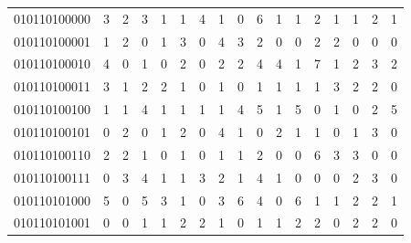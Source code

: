 \documentclass[10pt,a4paper]{article}
\begin{document}
\begin{longtable}{ |c|c|c|c|c|c|c|c|c|c|c|c|c|c|c|c|c| }
    010110100000              & 3                            & 2                                & 3                            & 1                              & 1   & 4   & 1   & 0   & 6   & 1   & 1   & 2   & 1   & 1   & 2   & 1   \\
    010110100001              & 1                            & 2                                & 0                            & 1                              & 3   & 0   & 4   & 3   & 2   & 0   & 0   & 2   & 2   & 0   & 0   & 0   \\
    010110100010              & 4                            & 0                                & 1                            & 0                              & 2   & 0   & 2   & 2   & 4   & 4   & 1   & 7   & 1   & 2   & 3   & 2   \\
    010110100011              & 3                            & 1                                & 2                            & 2                              & 1   & 0   & 1   & 0   & 1   & 1   & 1   & 1   & 3   & 2   & 2   & 0   \\
    010110100100              & 1                            & 1                                & 4                            & 1                              & 1   & 1   & 1   & 4   & 5   & 1   & 5   & 0   & 1   & 0   & 2   & 5   \\
    010110100101              & 0                            & 2                                & 0                            & 1                              & 2   & 0   & 4   & 1   & 0   & 2   & 1   & 1   & 0   & 1   & 3   & 0   \\
    010110100110              & 2                            & 2                                & 1                            & 0                              & 1   & 0   & 1   & 1   & 2   & 0   & 0   & 6   & 3   & 3   & 0   & 0   \\
    010110100111              & 0                            & 3                                & 4                            & 1                              & 1   & 3   & 2   & 1   & 4   & 1   & 0   & 0   & 0   & 2   & 3   & 0   \\
    010110101000              & 5                            & 0                                & 5                            & 3                              & 1   & 0   & 3   & 6   & 4   & 0   & 6   & 1   & 1   & 2   & 2   & 1   \\
    010110101001              & 0                            & 0                                & 1                            & 1                              & 2   & 2   & 1   & 0   & 1   & 1   & 2   & 2   & 0   & 2   & 2   & 0   \\

\end{longtable}
\end{document}
